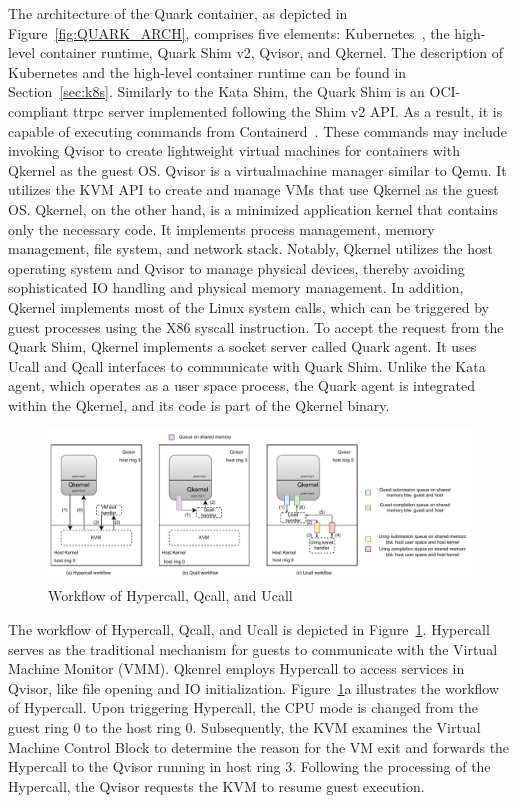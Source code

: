 The architecture of the Quark container, as depicted in Figure~\ref{fig:QUARK_ARCH}, comprises five elements: Kubernetes~\cite*{k8s}, the high-level container runtime, Quark Shim v2, Qvisor, and Qkernel. The description of Kubernetes and the high-level container runtime can be found in Section~\ref{sec:k8s}. 
Similarly to the Kata Shim, the Quark Shim is an OCI-compliant ttrpc server implemented following the Shim v2 API. As a result, it is capable of executing commands from Containerd~\cite*{containerd}. These commands may include invoking Qvisor to create lightweight virtual machines for 
containers with Qkernel as the guest OS. Qvisor is a virtualmachine manager similar to Qemu. It utilizes the KVM API to create and manage VMs that use Qkernel as the guest OS. Qkernel, on the other hand, is a minimized application kernel that contains only the necessary code. It implements process 
management, memory management, file system, and network stack. Notably, Qkernel utilizes the host operating system and Qvisor to manage physical devices, thereby avoiding sophisticated IO handling and physical memory management. In addition, Qkernel implements most of the Linux system calls, which can be triggered by 
guest processes using the X86 syscall instruction. To accept the request from the Quark Shim,  Qkernel implements a socket server called Quark agent. It uses Ucall 
and Qcall interfaces to communicate with Quark Shim. Unlike the Kata agent, which operates as a user space process, the Quark agent is integrated within the Qkernel, and its code is part of the Qkernel binary.



\begin{figure}[htp]
  \centering
  \includegraphics[width=1\textwidth]{images/hypercall_qcall_ucall.pdf}
  \caption[Workflow of Hypercall, Qcall, and Ucall]{Workflow of Hypercall, Qcall, and Ucall}
  \label{fig:hypercall_qcall_ucall}
\end{figure}


The workflow of Hypercall, Qcall, and Ucall is depicted in Figure~\ref{fig:hypercall_qcall_ucall}. Hypercall serves as the traditional mechanism for guests to communicate with the Virtual Machine Monitor (VMM). Qkenrel employs Hypercall to access services in Qvisor, like file opening and IO 
initialization. Figure~\ref{fig:hypercall_qcall_ucall}a illustrates the workflow of Hypercall. Upon triggering Hypercall, the CPU mode is changed from the guest ring 0  to the host ring 0. Subsequently, the KVM examines the Virtual Machine Control Block to determine the reason for the VM exit and 
forwards the Hypercall to the Qvisor running in host ring 3. Following the processing of the Hypercall, the Qvisor requests the KVM to resume guest execution.

